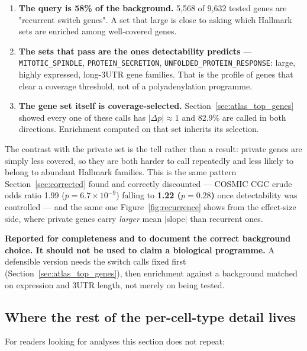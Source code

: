 \documentclass[11pt,a4paper]{article}
\begin{document}
\begin{enumerate}[nosep]
  \item \textbf{The query is 58\% of the background.} 5,568 of 9,632 tested
    genes are "recurrent switch genes". A set that large is close to asking
    which Hallmark sets are enriched among well-covered genes.
  \item \textbf{The sets that pass are the ones detectability predicts} ---
    \texttt{MITOTIC\_SPINDLE}, \texttt{PROTEIN\_SECRETION},
    \texttt{UNFOLDED\_PROTEIN\_RESPONSE}: large, highly expressed, long-3\textquotesingle{}UTR
    gene families. That is the profile of genes that clear a coverage threshold,
    not of a polyadenylation programme.
  \item \textbf{The gene set itself is coverage-selected.}
    Section~\ref{sec:atlas_top_genes} showed every one of these calls has
    $|\Delta p| \approx 1$ and 82.9\% are called in both directions. Enrichment
    computed on that set inherits its selection.
\end{enumerate}

The contrast with the private set is the tell rather than a result: private
genes are simply less covered, so they are both harder to call repeatedly and
less likely to belong to abundant Hallmark families. This is the same pattern
Section~\ref{sec:corrected} found and correctly discounted --- COSMIC CGC crude
odds ratio 1.99 ($p = 6.7\times10^{-9}$) falling to \textbf{1.22 ($p = 0.28$)}
once detectability was controlled --- and the same one
Figure~\ref{fig:recurrence} shows from the effect-size side, where private genes
carry \emph{larger} mean $|$slope$|$ than recurrent ones.

\textbf{Reported for completeness and to document the correct background choice.
It should not be used to claim a biological programme.} A defensible version
needs the switch calls fixed first (Section~\ref{sec:atlas_top_genes}), then
enrichment against a background matched on expression and 3\textquotesingle{}UTR
length, not merely on being tested.

\subsection{Where the rest of the per-cell-type detail lives}
\label{sec:atlas_pointers}

For readers looking for analyses this section does not repeat:
\end{document}
